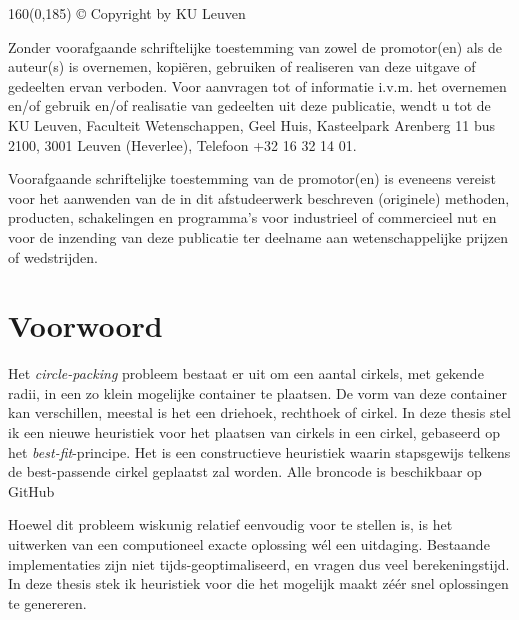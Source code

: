 \documentclass[12pt,a4paper,oneside]{book}
\begin{document}
\newpage
\thispagestyle{empty}
\begin{textblock}{160}(0,185)
© Copyright by KU Leuven

Zonder voorafgaande schriftelijke toestemming van zowel de promotor(en) als de auteur(s) is overnemen, kopiëren, gebruiken of realiseren van deze uitgave of gedeelten ervan verboden. Voor aanvragen tot of informatie i.v.m. het overnemen en/of gebruik en/of realisatie van gedeelten uit deze publicatie, wendt u tot de KU Leuven, Faculteit Wetenschappen, Geel Huis, Kasteelpark Arenberg 11 bus 2100, 3001 Leuven (Heverlee), Telefoon +32 16 32 14 01.

Voorafgaande schriftelijke toestemming van de promotor(en) is eveneens vereist voor het aanwenden van de in dit afstudeerwerk beschreven (originele) methoden, producten, schakelingen en programma’s voor industrieel of commercieel nut en voor de inzending van deze publicatie ter deelname aan wetenschappelijke prijzen of wedstrijden.
\end{textblock}

\newpage

\rmfamily
\setcounter{page}{0}

\newpage

\chapter*{Voorwoord}

Het \textit{circle-packing} probleem bestaat er uit om een aantal cirkels, met gekende radii, in een zo klein mogelijke container te plaatsen.
De vorm van deze container kan verschillen, meestal is het een driehoek, rechthoek of cirkel.
In deze thesis stel ik een nieuwe heuristiek voor het plaatsen van cirkels in een cirkel, gebaseerd op het \textit{best-fit}-principe.
Het is een constructieve heuristiek waarin stapsgewijs telkens de best-passende cirkel geplaatst zal worden.
Alle broncode is beschikbaar op GitHub \cite{circle-packing-github}

Hoewel dit probleem wiskunig relatief eenvoudig voor te stellen is, is het uitwerken van een computioneel exacte oplossing wél een uitdaging.
Bestaande implementaties zijn niet tijds-geoptimaliseerd, en vragen dus veel berekeningstijd. 
In deze thesis stek ik heuristiek voor die het mogelijk maakt zéér snel oplossingen te genereren.
\end{document}
